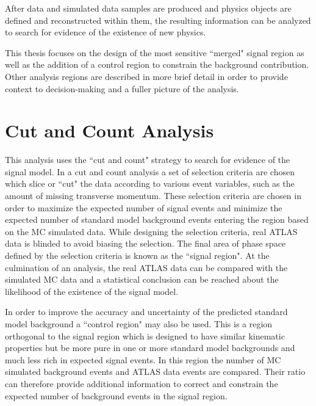 \label{chapter:analysis}
After data and simulated data samples are produced and physics objects are defined and reconstructed within them, the resulting information can be analyzed to search for evidence of the existence of new physics.

This thesis focuses on the design of the most sensitive ``merged" signal region as well as the addition of a control region to constrain the \ttbar background contribution. Other analysis regions are described in more brief detail in order to provide context to decision-making and a fuller picture of the analysis.

\section{Cut and Count Analysis}
This analysis uses the ``cut and count" strategy to search for evidence of the signal model. In a cut and count analysis a set of selection criteria are chosen which slice or ``cut" the data according to various event variables, such as the amount of missing transverse momentum. These selection criteria are chosen in order to maximize the expected number of signal events and minimize the expected number of standard model background events entering the region based on the MC simulated data. While designing the selection criteria, real ATLAS data is blinded to avoid biasing the selection. The final area of phase space defined by the selection criteria is known as the ``signal region". At the culmination of an analysis, the real ATLAS data can be compared with the simulated MC data and a statistical conclusion can be reached about the likelihood of the existence of the signal model.

In order to improve the accuracy and uncertainty of the predicted standard model background a ``control region" may also be used. This is a region orthogonal to the signal region which is designed to have similar kinematic properties but be more pure in one or more standard model backgrounds and much less rich in expected signal events. In this region the number of MC simulated background events and ATLAS data events are compared. Their ratio can therefore provide additional information to correct and constrain the expected number of background events in the signal region.

